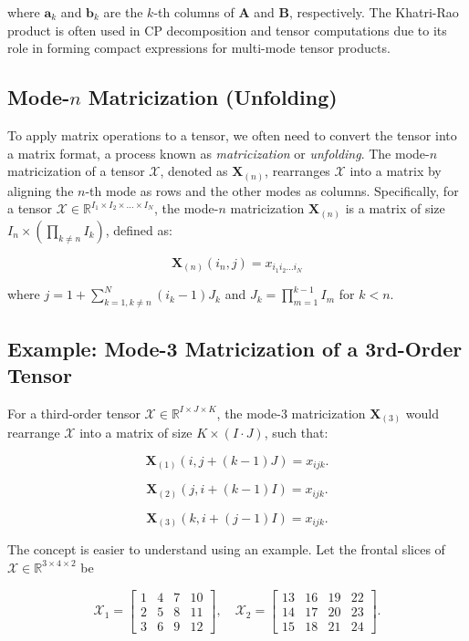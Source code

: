 \documentclass[a4paper,14pt]{article}
\theoremstyle{plain} %
\theoremstyle{definition} %
\theoremstyle{remark} %
\theoremstyle{definition}
\theoremstyle{remark}
\theoremstyle{remark}
\begin{document}
	where \(\mathbf{a}_k\) and \(\mathbf{b}_k\) are the \(k\)-th columns of \(\mathbf{A}\) and \(\mathbf{B}\), respectively. The Khatri-Rao product is often used in CP decomposition and tensor computations due to its role in forming compact expressions for multi-mode tensor products.
	
	\subsection{Mode-\( n \) Matricization (Unfolding)}
	
	To apply matrix operations to a tensor, we often need to convert the tensor into a matrix format, a process known as \textit{matricization} or \textit{unfolding}. The mode-\( n \) matricization of a tensor \(\mathcal{X}\), denoted as \(\mathbf{X}_{(n)}\), rearranges \(\mathcal{X}\) into a matrix by aligning the \( n \)-th mode as rows and the other modes as columns. Specifically, for a tensor \(\mathcal{X} \in \mathbb{R}^{I_1 \times I_2 \times \dots \times I_N}\), the mode-\( n \) matricization \(\mathbf{X}_{(n)}\) is a matrix of size \(I_n \times \left( \prod_{k \neq n} I_k \right)\), defined as:
	
	\[
	\mathbf{X}_{(n)}(i_n, j) = x_{i_1 i_2 \dots i_N}
	\]
	
	where \( j = 1 + \sum_{k=1, k \neq n}^N (i_k - 1) J_k \) and \( J_k = \prod_{m=1}^{k-1} I_m \) for \( k < n \).
	
	\subsection{Example: Mode-3 Matricization of a 3rd-Order Tensor}
	
	For a third-order tensor \(\mathcal{X} \in \mathbb{R}^{I \times J \times K}\), the mode-3 matricization \(\mathbf{X}_{(3)}\) would rearrange \(\mathcal{X}\) into a matrix of size \(K \times (I \cdot J)\), such that:
	
	\[
	\mathbf{X}_{(1)}(i, j + (k-1)J) = x_{ijk}.
	\]
	
	\[
	\mathbf{X}_{(2)}(j, i + (k-1)I) = x_{ijk}.
	\]
	
	\[
	\mathbf{X}_{(3)}(k, i + (j-1)I) = x_{ijk}.
	\]
	
	The concept is easier to understand using an example. Let the frontal slices of \( \mathcal{X} \in \mathbb{R}^{3 \times 4 \times 2} \) be
	
	\begin{equation}
		\mathcal{X}_1 = 
		\begin{bmatrix}
			1 & 4 & 7 & 10 \\
			2 & 5 & 8 & 11 \\
			3 & 6 & 9 & 12 
		\end{bmatrix}
		, \quad
		\mathcal{X}_2 = 
		\begin{bmatrix}
			13 & 16 & 19 & 22 \\
			14 & 17 & 20 & 23 \\
			15 & 18 & 21 & 24 
		\end{bmatrix}.
	\end{equation}
	
\end{document}
